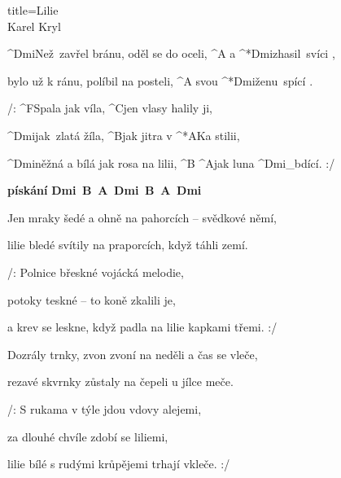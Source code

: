 \begin{song}{title=\predtitle\centering Lilie \\\large Karel Kryl  \vspace*{-0.3cm}}  %
\begin{centerjustified}
\nejnejvetsi

\sloka 
	^{Dmi\z}Než~zavřel bránu, oděl se do oceli, ^{A} a ^*{\z Dmi}zhasil~svíci ,  

	bylo už k ránu, políbil na posteli, ^{A} svou ^*{\z Dmi}ženu~spící . 

	/: ^{F\z}Spala jak víla, ^{C}jen vlasy halily ji, 
	
	^{Dmi\z}jak~zlatá žíla, ^{B}jak jitra v ^*{A}Ka stilii, 
	
	^{Dmi\z }něžná a bílá jak rosa na lilii, ^{B} ^{A}jak luna ^{Dmi{\color{white}\_}}bdící. :/ 

\phantom{tom}

\textbf{pískání} \textbf{Dmi\, B\, A\, Dmi\, B\, A\, Dmi}

\sloka
	Jen mraky šedé a ohně na pahorcích -- svědkové němí, 
	
	lilie bledé svítily na praporcích, když táhli zemí.

	/: Polnice břeskné vojácká melodie, 

	potoky teskné -- to koně zkalili je, 
	
	a krev se leskne, když padla na lilie kapkami třemi. :/ 

\sloka
	Dozrály trnky, zvon zvoní na neděli a čas se vleče, 

	rezavé skvrnky zůstaly na čepeli u jílce meče.
	
	/: S rukama v týle jdou vdovy alejemi, 

	za dlouhé chvíle zdobí se liliemi, 
	
	lilie bílé s rudými krůpějemi trhají vkleče. :/  


\end{centerjustified}
\setcounter{Slokočet}{0}
\end{song}
